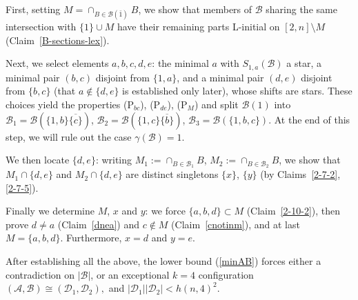 \documentclass[a4paper,11pt]{article}
\newcommand{\m}{\mathcal}
\begin{document}
First, setting $M=\cap_{B\in\m B(\bar1)}B$, we show that members of $\m B$ sharing the same intersection with $\{1\}\cup M$ have their remaining parts L-initial on $[2,n]\setminus M$ (Claim~\ref{B-sections-lex}).

Next, we select elements $a,b,c,d,e$: the minimal $a$ with
$S_{1,a}(\m B)$ a star, a minimal pair $(b,c)$ disjoint from $\{1,a\}$,
and a minimal pair $(d,e)$ disjoint from $\{b,c\}$ (that $a\notin\{d,e\}$
is established only later), whose shifts are stars. These choices yield
the properties (P$_{bc}$), (P$_{de}$), (P$_M$) and split $\m B(1)$ into
$\m B_1=\m B(\{1,b\}\overline{\{c\}})$,
$\m B_2=\m B(\{1,c\}\overline{\{b\}})$, $\m B_3=\m B(\{1,b,c\})$.
At the end of this step, we will rule out the case $\gamma(\m B)=1$.

We then locate $\{d,e\}$: writing $M_1:=\cap_{B\in\m B_1}B$,
$M_2:=\cap_{B\in\m B_2}B$, we show that $M_1\cap\{d,e\}$ and
$M_2\cap\{d,e\}$ are distinct singletons $\{x\}$, $\{y\}$
(by Claims~\ref{2-7-2}, \ref{2-7-5}).

Finally we determine $M$, $x$ and $y$: we force $\{a,b,d\}\subset M$
(Claim~\ref{2-10-2}), then prove $d\ne a$ (Claim~\ref{dnea}) and
$c\notin M$ (Claim~\ref{cnotinm}), and at last $M=\{a,b,d\}$. Furthermore, $x=d$ and $y=e$.

After establishing all the above, the lower bound (\ref{minAB}) forces either a contradiction on
$|\mathcal B|$, or an exceptional $k=4$ configuration $(\mathcal A,\mathcal B)\cong(\mathcal D_1,\mathcal D_2),$ and $|\m D_1||\m D_2|<h(n,4)^2$. 

\fi
\end{document}

